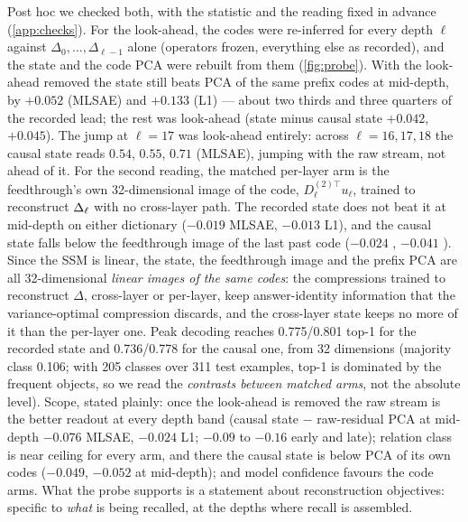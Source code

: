 Post hoc we checked both, with the statistic and the reading fixed in advance
(\cref{app:checks}). For the look-ahead, the codes were re-inferred for every
depth $\ell$ against $\Delta_0,\dots,\Delta_{\ell-1}$ alone (operators frozen,
everything else as recorded), and the state and the code PCA were rebuilt from
them (\cref{fig:probe}). With the look-ahead removed the state still beats PCA
of the same prefix codes at mid-depth, by $+0.052$  (MLSAE) and $+0.133$
 (L1) --- about two thirds and three quarters of the
recorded lead; the rest was look-ahead (state minus causal state $+0.042$,
$+0.045$). The jump at $\ell{=}17$ was look-ahead entirely: across
$\ell = 16, 17, 18$ the causal state reads $0.54$, $0.55$, $0.71$ (MLSAE),
jumping with the raw stream, not ahead of it. For the second reading, the
matched per-layer arm is the feedthrough's own 32-dimensional image of the
code, $D^{(2)\top}_\ell u_\ell$, trained to reconstruct $\Delta_\ell$ with no
cross-layer path. The recorded state does not beat it at mid-depth on either
dictionary ($-0.019$  MLSAE, $-0.013$
 L1), and the causal state falls below the feedthrough
image of the last past code ($-0.024$ , $-0.041$
). Since the SSM is linear, the state, the feedthrough
image and the prefix PCA are all 32-dimensional \emph{linear images of the
same codes}: the compressions trained to reconstruct $\Delta$, cross-layer or
per-layer, keep answer-identity information that the variance-optimal
compression discards, and the cross-layer state keeps no more of it than the
per-layer one. Peak decoding reaches 0.775/0.801 top-1 for the recorded state
and 0.736/0.778 for the causal one, from 32 dimensions (majority class 0.106;
with 205 classes over 311 test examples, top-1 is dominated by the frequent
objects, so we read the \emph{contrasts between matched arms}, not the absolute
level). Scope, stated plainly: once the look-ahead is removed the raw stream is
the better readout at every depth band (causal state $-$ raw-residual PCA at
mid-depth $-0.076$  MLSAE, $-0.024$
 L1; $-0.09$ to $-0.16$ early and late); relation class
is near ceiling for every arm, and there the causal state is below PCA of its
own codes ($-0.049$, $-0.052$ at mid-depth); and model confidence favours the
code arms. What the probe supports is a statement about reconstruction
objectives: specific to \emph{what} is being recalled, at the depths where
recall is assembled.

